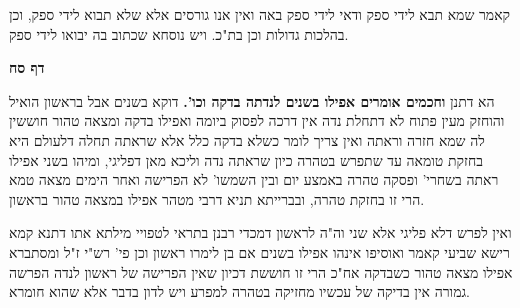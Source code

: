 \documentclass[12pt, openany]{book}
\newcommand{\sethebfont}{
\fontsize{10.5pt}{21.0pt} \selectfont
}
\newcommand{\twocol}[1]{
	{\sethebfont \begin{multicols}{2}
			#1
	\end{multicols}}	
}
\newcommand{\sectname}{}
\newcommand{\newsection}[1]{
	\addcontentsline{toc}{section}{#1}
	\renewcommand{\sectname}{#1}	
	\vspace{-\baselineskip}
	\begin{center}
		\textbf{%
\fontsize{16pt}{16pt}\selectfont
			#1}
	\end{center}
	\vspace{-\baselineskip}
	\nopagebreak
}
\begin{document}
{קאמר שמא תבא לידי ספק ודאי לידי ספק באה ואין אנו גורסים אלא שלא תבוא לידי ספק, וכן בהלכות גדולות וכן בת"כ. ויש נוסחא שכתוב בה יבואו לידי ספק. }

\newsection{דף סח}
\twocol{הא דתנן \textbf{וחכמים אומרים אפילו בשנים לנדתה בדקה וכו'.}  דוקא בשנים אבל בראשון הואיל והוחזק מעין פתוח לא דתחלת נדה אין דרכה לפסוק ביומה ואפילו בדקה ומצאה טהור חוששין לה שמא חזרה וראתה ואין צריך לומר כשלא בדקה כלל אלא שראתה תחלה דלעולם היא בחזקת טומאה עד שתפרש בטהרה כיון שראתה נדה וליכא מאן דפליגי, ומיהו בשני אפילו ראתה בשחרי' ופסקה טהרה באמצע יום ובין השמשו' לא הפרישה ואחר הימים מצאה טמא הרי זו בחזקת טהרה, ובברייתא תניא דרבי מטהר אפילו במצאה טהור בראשון.\par  ואין לפרש דלא פליגי אלא שני וה"ה לראשון דמכדי רבנן בתראי לטפויי מילתא אתו דתנא קמא רישא שביעי קאמר ואוסיפו אינהו אפילו בשנים אם בן לימרו ראשון וכן פי' רש"י ז"ל ומסתברא אפילו מצאה טהור כשבדקה אח"כ הרי זו חוששת דכיון שאין הפרישה של ראשון לנדה הפרשה גמורה אין בדיקה של עכשיו מחזיקה בטהרה למפרע ויש לדון בדבר אלא שהוא חומרא. }
\end{document}
